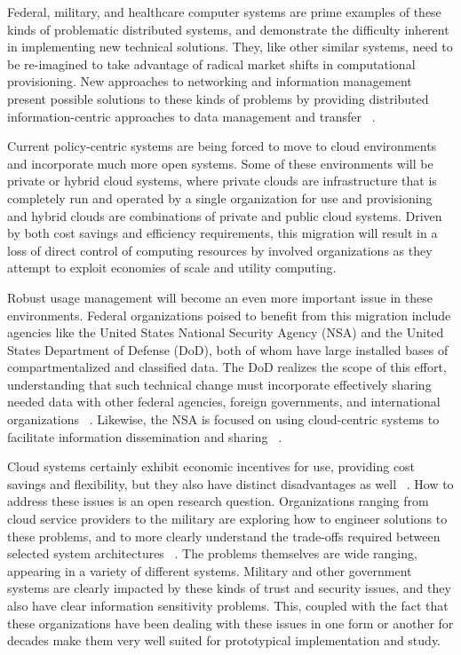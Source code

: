 Federal, military, and healthcare computer systems are prime examples of these kinds of problematic distributed systems, and demonstrate the difficulty inherent in implementing new technical solutions.  They, like other similar systems, need to be re-imagined to take advantage of radical market shifts in computational provisioning.  New approaches to networking and information management present possible solutions to these kinds of problems by providing distributed information-centric approaches to data management and transfer ~\cite{proposal:info-sharing-strategy}.

Current policy-centric systems are being forced to move to cloud environments and incorporate much more open systems.  Some of these environments will be private or hybrid cloud systems, where private clouds are infrastructure that is completely run and operated by a single organization for use and provisioning and hybrid clouds are combinations of private and public cloud systems.  Driven by both cost savings and efficiency requirements, this migration will result in a loss of direct control of computing resources by involved organizations as they attempt to exploit economies of scale and utility computing.

Robust usage management will become an even more important issue in these environments.  Federal organizations poised to benefit from this migration include agencies like the United States National Security Agency (NSA) and the United States Department of Defense (DoD), both of whom have large installed bases of compartmentalized and classified data.  The DoD realizes the scope of this effort, understanding that such technical change must incorporate effectively sharing needed data with other federal agencies, foreign governments, and international organizations ~\cite{proposal:info-sharing-strategy}.  Likewise, the NSA is focused on using cloud-centric systems to facilitate information dissemination and sharing ~\cite{proposal:nsa-cloud}.

Cloud systems certainly exhibit economic incentives for use, providing cost savings and flexibility, but they also have distinct disadvantages as well ~\cite{proposal:privacy-security-trust-cloud}.  How to address these issues is an open research question.  Organizations ranging from cloud service providers to the military are exploring how to engineer solutions to these problems, and to more clearly understand the trade-offs required between selected system architectures ~\cite{proposal:assured-info-sharing}.  The problems themselves are wide ranging, appearing in a variety of different systems.  Military and other government systems are clearly impacted by these kinds of trust and security issues, and they also have clear information sensitivity problems.  This, coupled with the fact that these organizations have been dealing with these issues in one form or another for decades make them very well suited for prototypical implementation and study.

